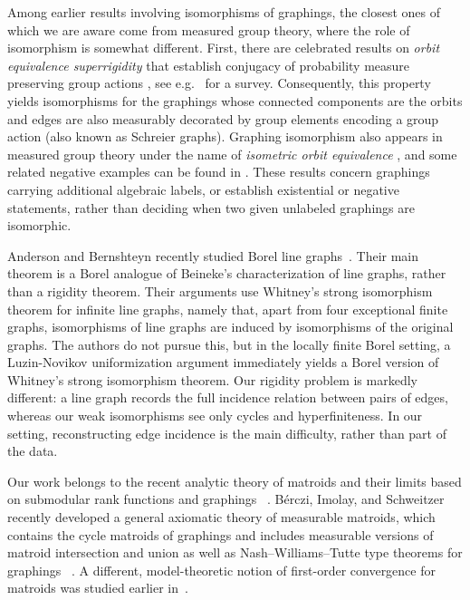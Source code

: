\documentclass{article}
\theoremstyle{plain}
\theoremstyle{definition}
\begin{document}
Among earlier results involving isomorphisms of graphings, the closest ones of
which we are aware come from measured group theory, where the role of
isomorphism is somewhat different. First, there are celebrated results on \emph{orbit equivalence superrigidity} that establish conjugacy of probability measure preserving group actions \cite{furman1999orbit,monod2006orbit, popa2007cocycle}, see e.g.\ \cite{furman2011survey} for a survey. Consequently, this property yields isomorphisms for the graphings whose connected components are the orbits and edges are also measurably decorated by group elements encoding a group action (also known as Schreier graphs). Graphing isomorphism also appears in measured group theory under the name of \emph{isometric orbit equivalence} \cite{joseph2022isometric}, and some related negative examples can be found in \cite{Weilacher}. These results concern graphings carrying additional algebraic labels, or establish existential or negative statements, rather than deciding when two given unlabeled graphings are isomorphic.

Anderson and Bernshteyn recently studied Borel line graphs~\cite{anderson2024borel}. Their main theorem is a Borel analogue of Beineke's characterization of line graphs, rather than a rigidity theorem. Their arguments use Whitney's strong isomorphism theorem for infinite line graphs, namely that, apart from four exceptional finite graphs, isomorphisms of line graphs are induced by isomorphisms of the original graphs. The authors do not pursue this, but in the locally finite Borel setting, a Luzin-Novikov uniformization argument immediately yields a Borel version of Whitney's strong isomorphism theorem. Our rigidity problem is markedly different: a line graph records the full incidence relation between pairs of edges, whereas our weak isomorphisms see only cycles and hyperfiniteness. In our setting, reconstructing edge incidence is the main difficulty, rather than part of the data.


Our work belongs to the recent analytic theory of matroids and their limits based on submodular rank functions and graphings ~\cite{lovasz2023submodular,lovasz2024matroid,berczi2024quotient, berczi2025convergent,berczi2026cycle}. B\'erczi, Imolay, and Schweitzer recently developed a general axiomatic theory of measurable matroids, which contains the cycle matroids of graphings and includes measurable versions of matroid intersection and union as well as Nash--Williams--Tutte type theorems for graphings ~\cite{Measurable_Matroids}. A different, model-theoretic notion of first-order convergence for matroids was studied earlier in~\cite{kardovs2017first}.
\end{document}
